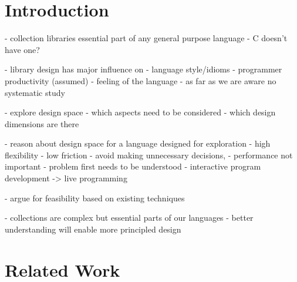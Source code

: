 \documentclass[sigconf, 10pt, review]{acmart}
\begin{document}


\maketitle

\section{Introduction}

\begin{note}
- collection libraries
  essential part of any general purpose language
  - C doesn't have one?

- library design has major influence on
  - language style/idioms
  - programmer productivity (assumed)
  - feeling of the language
- as far as we are aware no systematic study

- explore design space
  - which aspects need to be considered
  - which design dimensions are there


- reason about design space for a language designed for exploration
 - high flexibility
 - low friction
   - avoid making unnecessary decisions,
   - performance not important
   - problem first needs to be understood
 - interactive program development
 -> live programming

- argue for feasibility based on existing techniques

- collections are complex but essential parts of our languages
  - better understanding will enable more principled design

\end{note}

\section{Related Work}
\end{document}
